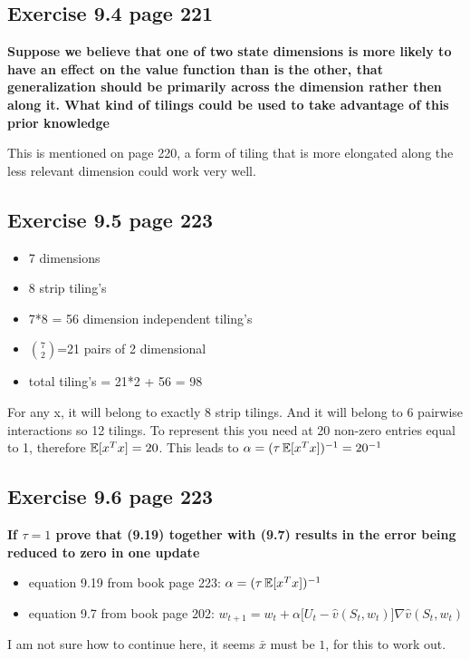 \subsection{Exercise 9.4 page 221}
\textbf{Suppose we believe that one of two state dimensions is more likely to have an effect on the value function than is the other, that generalization should be primarily across the dimension rather then along it. What kind of tilings could be used to take advantage of this prior knowledge}

This is mentioned on page 220, a form of tiling that is more elongated along the less relevant dimension could work very well.

\subsection{Exercise 9.5 page 223}

\begin{itemize}
	\item 7 dimensions
	\item 8 strip tiling's
	\item 7*8 = 56 dimension independent tiling's
	\item $\binom{7}{2}$=21 pairs of 2 dimensional 
	\item total tiling's = 21*2 + 56 = 98
\end{itemize}

For any x, it will belong to exactly 8 strip tilings. And it will belong to 6 pairwise interactions so 12 tilings. To represent this you need at 20 non-zero entries equal to 1, therefore $\operatorname{\mathbb{E}}[x^Tx] = 20$. This leads to $\alpha = (\tau\operatorname{\mathbb{E}}[x^Tx])^{-1}=20^{-1}$

\subsection{Exercise 9.6 page 223}
\textbf{If $\tau=1$ prove that (9.19) together with (9.7) results in the error being reduced to zero in one update}

\begin{itemize}
	\item equation 9.19 from book page 223: $\alpha = (\tau \operatorname{\mathbb{E}}[x^Tx])^{-1}$
	\item equation 9.7 from book page 202: $w_{t+1} = w_t + \alpha \big[ U_t - \hat{v}(S_t, w_t)\big]\nabla \hat{v}(S_t, w_t)$
\end{itemize}

I am not sure how to continue here, it seems $\bar{x}$ must be $1$, for this to work out.

